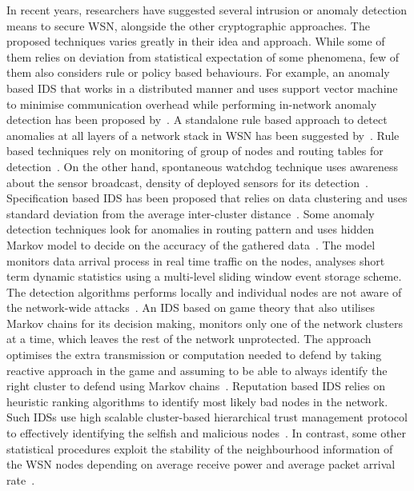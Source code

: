 \documentclass[conference]{IEEEtran}
\newcommand{\notedme}[1]{\raisebox{0pt}[0pt][0pt]{\pdfcomment[open=true,color=blue]{#1}}}
\begin{document}
In recent years, researchers have suggested several intrusion or anomaly detection means to secure WSN, alongside the other cryptographic approaches.
The proposed techniques varies greatly in their idea and approach.
While some of them relies on deviation from statistical expectation of some phenomena, few of them also considers rule or policy based behaviours.
For example, an anomaly based IDS that works in a distributed manner and uses support vector machine to minimise communication overhead while performing in-network anomaly detection has been proposed by~\cite{ISI:000257882502160}.
A standalone rule based approach to detect anomalies at all layers of a network stack in WSN has been suggested by~\cite{1515559}.
Rule based  techniques rely on monitoring of group of nodes and routing tables for detection~\cite{ISI:000298891500099, Chen:2009:NMI:1516241.1516282, 1424814, Strikos_afull}.
On the other hand, spontaneous watchdog technique uses awareness about the sensor broadcast, density of deployed sensors for its detection~\cite{1593102}.
Specification based  IDS has been proposed that relies on data clustering and uses standard deviation from the average inter-cluster distance~\cite{Chen:2009:NMI:1516241.1516282, 4085803}.
Some anomaly  detection techniques look for anomalies in routing pattern and uses  hidden Markov model to decide on the accuracy of the gathered data~\cite{1290173, 4024996}.%
The model monitors data arrival process in real time traffic on the nodes, analyses short term dynamic statistics using a multi-level sliding window event storage scheme. %
The detection algorithms performs locally and individual nodes are not aware of the network-wide attacks~\cite{1515559}.
An IDS based on game theory that also utilises Markov chains for its decision making, monitors only one of the network clusters at a time, which leaves the rest of the network unprotected.
The approach optimises the extra transmission or computation needed to defend by taking reactive approach in the game and assuming to be able to always identify the right cluster to defend using Markov chains~\cite{1347798, Das07preventingdos, Reddy:2009:GTA:1607720.1607944}.
Reputation based IDS relies on heuristic ranking algorithms to identify most likely bad nodes in the network.
Such IDSs use high scalable cluster-based hierarchical trust management protocol to effectively identifying the selfish and malicious nodes~\cite{6174485}.
In contrast, some other statistical procedures exploit the stability of the neighbourhood information of the WSN nodes depending on average receive power and average packet arrival rate~\cite{1512911}.
\end{document}

